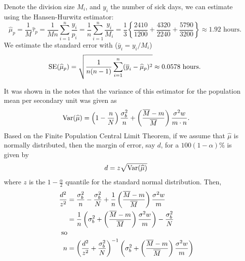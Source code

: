 \documentclass[usenames,dvipsnames]{homework}
\begin{document}

\begin{solution} 
  Denote the division size $M_i$, and $y_i$ the number of sick days, we can estimate using the Hansen-Hurwitz estimator:
  $$
    \hat\mu_p = \frac 1M \hat\tau_p = \frac 1{Mn} \sum_{i=1}^n \frac{y_i}{p_i} = \frac{1}{n}\sum_{i=1}^n \frac{y_i}{M_i} = \frac 13\left\{\frac{2410}{1200} +  \frac{4320}{2240} + \frac{5790}{3200}\right\} \approx 1.92 \text{ hours. }
  $$
  We estimate the standard error with ($\bar y_i = y_i/M_i$)
  $$
    \SE(\hat\mu_p) = \sqrt{ \frac1{n(n-1)}\sum_{i=1}^n(\bar y_i - \hat\mu_p)^2} \approx 0.0578\text{ hours. }
  $$

\end{solution}

\begin{solution}
  It was shown in the notes that the variance of this estimator for the population mean per secondary unit was given as
  $$
    \Var(\hat \mu) = \left(1 - \frac nN\right) \frac{\sigma_b^2}{n} + \left(\frac {\bar M - m}{\bar M}\right) \frac{\sigma^2w}{m\cdot n}.
  $$
  Based on the Finite Population Central Limit Theorem, if we assume that $\hat\mu$ is normally distributed, then the margin of error, say $d$, for a $100(1-\alpha)\%$ is given by
  $$
    d = z \sqrt{\Var(\hat\mu)}
  $$
  where $z$ is the $1-\frac \alpha 2$ quantile for the standard normal distribution. Then,
  \begin{align*}
    \frac{d^2}{z^2} 
    &= \frac{\sigma_b^2}{n} - \frac{\sigma_b^2}{N} + \frac 1n\left( \frac {\bar M - m}{\bar M}\right) \frac{\sigma^2w}{m}\\
    &= \frac 1n\left(\sigma_b^2 + \left(\frac {\bar M - m}{\bar M}\right) \frac{\sigma^2w}{m}\right)  - \frac{\sigma_b^2}{N}  \\
    \intertext{ so }
    n&= \left( \frac{d^2}{z^2} +  \frac{\sigma_b^2}{N}\right)^{-1}\left(\sigma_b^2 + \left(\frac {\bar M - m}{\bar M}\right) \frac{\sigma^2w}{m}\right)
  \end{align*}

\end{solution}
\end{document}
